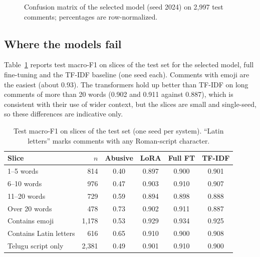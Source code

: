 \documentclass[conference]{IEEEtran}
\begin{document}
\begin{figure}[t]
\centering
{}
\caption{Confusion matrix of the selected model (seed 2024) on 2,997 test comments; percentages are row-normalized.}
\label{fig:cm}
\end{figure}

\subsection{Where the models fail}
Table~\ref{tab:slices} reports test macro-F1 on slices of the test set for the selected model, full fine-tuning and the TF-IDF baseline (one seed each). Comments with emoji are the easiest (about 0.93). The transformers hold up better than TF-IDF on long comments of more than 20 words (0.902 and 0.911 against 0.887), which is consistent with their use of wider context, but the slices are small and single-seed, so these differences are indicative only.

\begin{table}[t]
\caption{Test macro-F1 on slices of the test set (one seed per system). ``Latin letters'' marks comments with any Roman-script character.}
\label{tab:slices}
\centering
\footnotesize
\setlength{\tabcolsep}{4pt}
\begin{tabular}{lrcccc}
\toprule
Slice & $n$ & Abusive & LoRA & Full FT & TF-IDF \\
\midrule
1--5 words & 814 & 0.40 & 0.897 & 0.900 & 0.901 \\
6--10 words & 976 & 0.47 & 0.903 & 0.910 & 0.907 \\
11--20 words & 729 & 0.59 & 0.894 & 0.898 & 0.888 \\
Over 20 words & 478 & 0.73 & 0.902 & 0.911 & 0.887 \\
Contains emoji & 1,178 & 0.53 & 0.929 & 0.934 & 0.925 \\
Contains Latin letters & 616 & 0.65 & 0.910 & 0.900 & 0.908 \\
Telugu script only & 2,381 & 0.49 & 0.901 & 0.910 & 0.900 \\
\bottomrule
\end{tabular}
\end{table}
\end{document}
